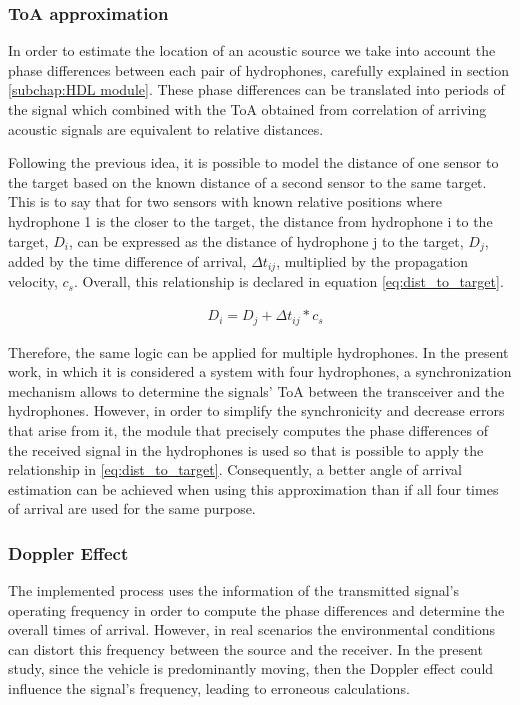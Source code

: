 \subsubsection{ToA approximation} \label{subsubsec:toa-approx}

In order to estimate the location of an acoustic source we take into account the phase differences between each pair of hydrophones, carefully explained in section \ref{subchap:HDL module}. These phase differences can be translated into periods of the signal which combined with the ToA obtained from correlation of arriving acoustic signals are equivalent to relative distances.

Following the previous idea, it is possible to model the distance of one sensor to the target based on the known distance of a second sensor to the same target. 
This is to say that for two sensors with known relative positions where hydrophone 1 is the closer to the target, the distance from hydrophone i to the target, $D_i$, can be expressed as the distance of hydrophone j to the target, $D_j$, added by the time difference of arrival, $\Delta t_{ij}$, multiplied by the propagation velocity, $c_s$. Overall, this relationship is declared in equation \ref{eq:dist_to_target}.

\begin{eqnarray}
& D_i = D_j + \Delta t_{ij} * c_s
\label{eq:dist_to_target}
\end{eqnarray}

Therefore, the same logic can be applied for multiple hydrophones. In the present work, in which it is considered a system with four hydrophones, a synchronization mechanism allows to determine the signals' ToA between the transceiver and the hydrophones. However, in order to simplify the synchronicity and decrease errors that arise from it, the module that precisely computes the phase differences of the received signal in the hydrophones is used so that is possible to apply the relationship in \ref{eq:dist_to_target}. Consequently, a better angle of arrival estimation can be achieved when using this approximation than if all four times of arrival are used for the same purpose.

\subsubsection{Doppler Effect}

The implemented process uses the information of the transmitted signal's operating frequency in order to compute the phase differences and determine the overall times of arrival. However, in real scenarios the environmental conditions can distort this frequency between the source and the receiver. In the present study, since the vehicle is predominantly moving, then the Doppler effect could influence the signal's frequency, leading to erroneous calculations.

